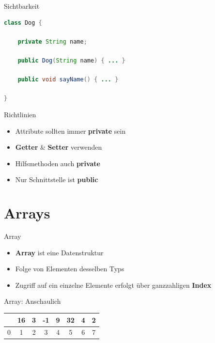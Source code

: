 \documentclass[18pt]{beamer}
\begin{document}
\begin{frame}[fragile]{Sichtbarkeit}
    \begin{exampleblock}{}
        \begin{lstlisting}[language=Java,basicstyle=\scriptsize]
class Dog {

    private String name;

    public Dog(String name) { ... }

    public void sayName() { ... }

}
        \end{lstlisting}
    \end{exampleblock}
\end{frame}

\begin{frame}{Richtlinien}
    \begin{itemize}
        \item Attribute sollten immer \textbf{private} sein
        \item \textbf{Getter} \& \textbf{Setter} verwenden
        \item Hilfsmethoden auch \textbf{private}
        \item Nur Schnittstelle ist \textbf{public}
    \end{itemize}
\end{frame}

\section{Arrays}

\begin{frame}{Array}
    \begin{block}{}
        \begin{itemize}
            \item \textbf{Array} ist eine Datenstruktur
            \item Folge von Elementen desselben Typs
            \item Zugriff auf ein einzelne Elemente erfolgt über ganzzahligen \textbf{Index}
        \end{itemize}
    \end{block}
\end{frame}

\begin{frame}{Array: Anschaulich}
    \center
    \begin{tabular}{cccccccc}
        \hline
        \rowcolor{lime}
        \multicolumn{1}{|c|}{7} &
        \multicolumn{1}{c|}{16} &
        \multicolumn{1}{c|}{3} &
        \multicolumn{1}{c|}{-1} &
        \multicolumn{1}{c|}{9} &
        \multicolumn{1}{c|}{32} &
        \multicolumn{1}{c|}{4} &
        \multicolumn{1}{c|}{2}\\
        \hline
        0 & 1 & 2 & 3 & 4 & 5 & 6 & 7\\
    \end{tabular}
\end{frame}
\end{document}
